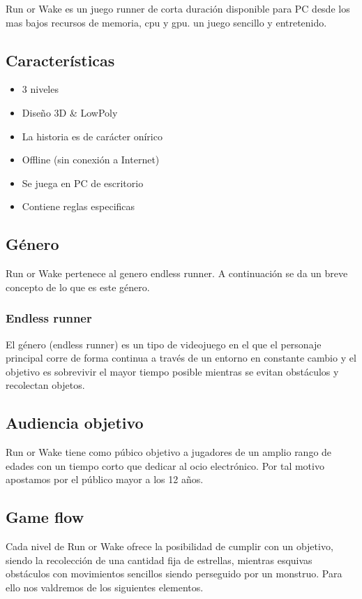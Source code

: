 Run or Wake es un juego runner de corta duración disponible para PC desde los mas bajos recursos de memoria, cpu y gpu. un juego sencillo y entretenido.

\subsection{Características}

\begin{itemize}
	\item 3 niveles
	\item Diseño 3D \& LowPoly
	\item La historia es de carácter onírico
	\item Offline (sin conexión a Internet)
	\item Se juega en PC de escritorio
	\item Contiene reglas especificas
\end{itemize}

\subsection{Género}

Run or Wake pertenece al genero endless runner. A continuación se
da un breve concepto de lo que es este género.

\subsubsection{ Endless runner}
El género (endless runner) es un tipo de videojuego en el que el
personaje principal corre de forma continua a través de un entorno
en constante cambio y el objetivo es sobrevivir el mayor tiempo
posible mientras se evitan obstáculos y recolectan objetos.

\subsection{Audiencia objetivo}

Run or Wake tiene como púbico objetivo a jugadores de un amplio rango
de edades con un tiempo corto que dedicar al ocio electrónico. Por tal
motivo apostamos por el público mayor a los 12 años.

\subsection{Game flow}

Cada nivel de Run or Wake ofrece la posibilidad de cumplir con un objetivo,
siendo la recolección de una cantidad fija de estrellas, mientras
esquivas obstáculos con movimientos sencillos siendo perseguido por
un monstruo. Para ello nos valdremos de los siguientes elementos.

